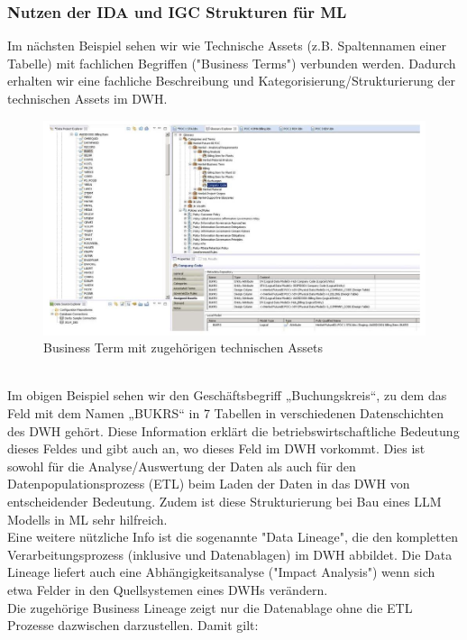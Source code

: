 \documentclass[12pt]{article}
\begin{document}
\subsubsection{Nutzen der IDA und IGC Strukturen für ML}
%
Im nächsten Beispiel sehen wir wie Technische Assets (z.B. Spaltennamen einer Tabelle) mit fachlichen Begriffen ("Business Terms") verbunden werden. Dadurch erhalten wir eine fachliche Beschreibung und Kategorisierung/Strukturierung der technischen Assets im DWH.\\ 
%
\begin{figure}[htp]
  \centering
  \hspace*{-0.4cm} 
  \includegraphics[width=1.05\textwidth]{Business-Term_mit_TechAssets}
  \caption{Business Term mit zugehörigen technischen Assets}
  \label{fig:IGC-BT+TA}
\end{figure}
\\[0.2cm]
Im obigen Beispiel sehen wir den Geschäftsbegriff „Buchungskreis“, zu dem das Feld mit dem Namen „BUKRS“ in 7 Tabellen in verschiedenen Datenschichten des DWH gehört. 
Diese Information erklärt die betriebswirtschaftliche Bedeutung dieses Feldes und gibt auch an, wo dieses Feld im DWH vorkommt. Dies ist sowohl für die Analyse/Auswertung der Daten als auch für den Datenpopulationsprozess (ETL) beim Laden der Daten in das DWH von entscheidender Bedeutung. Zudem ist diese Strukturierung bei Bau eines LLM Modells in ML sehr hilfreich.\\
Eine weitere nützliche Info ist die sogenannte "Data Lineage", die den kompletten Verarbeitungsprozess (inklusive und Datenablagen) im DWH abbildet. Die Data Lineage liefert auch eine Abhängigkeitsanalyse ("Impact Analysis") wenn sich etwa Felder in den Quellsystemen eines DWHs verändern.\\
Die zugehörige Business Lineage zeigt nur die Datenablage ohne die ETL Prozesse dazwischen darzustellen. Damit gilt:\\
\end{document}
